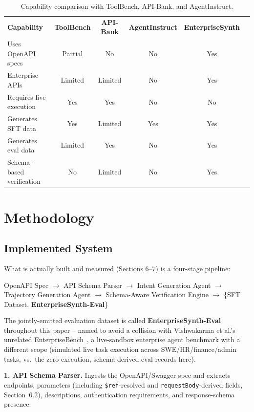 \documentclass[letterpaper]{article} %
\begin{document}
\begin{table}[t]
\centering
\footnotesize
\setlength{\tabcolsep}{2pt}
\begin{tabular}{lccccc}
\textbf{Capability} & \textbf{ToolBench} & \textbf{API-Bank} & \textbf{AgentInstruct} & \textbf{EnterpriseSynth} \\
Uses OpenAPI specs & Partial & No & No & Yes \\
Enterprise APIs & Limited & Limited & No & Yes \\
Requires live execution & Yes & Yes & No & No \\
Generates SFT data & Yes & Limited & Yes & Yes \\
Generates eval data & Limited & Yes & No & Yes \\
Schema-based verification & No & Limited & No & Yes \\
\end{tabular}
\caption{Capability comparison with ToolBench, API-Bank, and AgentInstruct.}
\label{tab:auto1}
\end{table}


\section{Methodology}

\subsection{Implemented System}
What is actually built and measured (Sections 6--7) is a four-stage pipeline:

\begin{center}
OpenAPI Spec $\rightarrow$ API Schema Parser $\rightarrow$ Intent Generation Agent
$\rightarrow$ Trajectory Generation Agent $\rightarrow$ Schema-Aware Verification Engine
$\rightarrow$ \{SFT Dataset, \textbf{EnterpriseSynth-Eval}\}
\end{center}

The jointly-emitted evaluation dataset is called \textbf{EnterpriseSynth-Eval} throughout this
paper -- named to avoid a collision with Vishwakarma et al.'s unrelated
EnterpriseBench~\cite{vishwakarma2025enterprisebench}, a live-sandbox enterprise agent benchmark
with a different scope (simulated live task execution across SWE/HR/finance/admin tasks, vs.\ the
zero-execution, schema-derived eval records here).

\textbf{1. API Schema Parser.} Ingests the OpenAPI/Swagger spec and extracts endpoints,
parameters (including \texttt{\$ref}-resolved and \texttt{requestBody}-derived fields, Section~6.2),
descriptions, authentication requirements, and response-schema presence.
\end{document}
